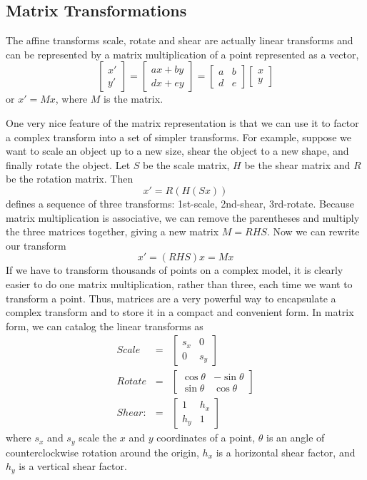 \documentclass[11pt]{amsart}
\begin{document}
\subsection{Matrix Transformations}
The affine transforms scale, rotate and shear are actually linear transforms and can be
represented by a matrix multiplication of a point represented as a vector,
\begin{equation}
\begin{bmatrix}
x' \\
y'
\end{bmatrix}
= 
\begin{bmatrix}
ax + by  \\
dx + ey
\end{bmatrix}
=
\begin{bmatrix}
a & b  \\
d & e
\end{bmatrix}
\begin{bmatrix}
x  \\
y
\end{bmatrix}
\end{equation}
or $x' = Mx$, where $M$ is the matrix.

One very nice feature of the matrix representation is that we can use it to factor a complex
transform into a set of simpler transforms. For example, suppose we want to scale an
object up to a new size, shear the object to a new shape, and finally rotate the object. Let
$S$ be the scale matrix, $H$ be the shear matrix and $R$ be the rotation matrix. Then
\[
x' = R(H(Sx))
\]
defines a sequence of three transforms: 1st-scale, 2nd-shear, 3rd-rotate. Because matrix multiplication is associative, we can remove the parentheses and multiply the three
matrices together, giving a new matrix $M = RHS$. Now we can rewrite our transform
\[
x' = (RHS)x = Mx
\]
If we have to transform thousands of points on a complex model, it is clearly easier to
do one matrix multiplication, rather than three, each time we want to transform a point.
Thus, matrices are a very powerful way to encapsulate a complex transform and to store
it in a compact and convenient form.
In matrix form, we can catalog the linear transforms as
\begin{eqnarray}
Scale & = &  
\begin{bmatrix}
s_x & 0 \\
0 & s_y
\end{bmatrix}
\\
 Rotate & = & 
\begin{bmatrix}
\cos \theta & -\sin \theta \\
\sin \theta &  \cos \theta
\end{bmatrix} 
\\
Shear: & = & 
\begin{bmatrix}
1 & h_x \\
h_y & 1
\end{bmatrix}
\end{eqnarray}
where $s_x$ and $s_y$ scale the $x$ and $y$ coordinates of a point, $\theta$ is an angle of counterclockwise
rotation around the origin, $h_x$ is a horizontal shear factor, and $h_y$ is a vertical shear factor.
\end{document}
